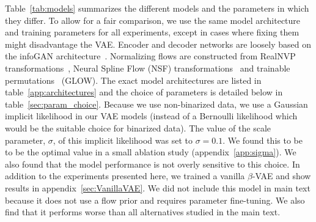 \documentclass[10pt]{article} \usepackage[accepted]{tmlr}
\newcommand{\rev}[1]{{\color{black}#1}}
\begin{document}
Table~\ref{tab:models} summarizes the different models and the parameters in which they differ. To allow for a fair comparison, we use the same model architecture and training parameters for all experiments, except in cases where fixing them might disadvantage the VAE. Encoder and decoder networks are loosely based on the infoGAN architecture~\citep{infoGAN}. Normalizing flows are constructed from RealNVP transformations~\citep{DinhSB16}, Neural Spline Flow (NSF) transformations~\citep{durkan2019neural} and trainable permutations~\citep{glow} (GLOW). The exact model architectures are listed in table~\ref{app:architectures} and the choice of parameters is detailed below in table~\ref{sec:param_choice}. Because we use non-binarized data, we use a Gaussian implicit likelihood in our VAE models (instead of a Bernoulli likelihood which would be the suitable choice for binarized data). The value of the scale parameter, $\sigma$, of this implicit likelihood was set to $\sigma=0.1$. We found this to be to be the optimal value in a small ablation study (appendix~\ref{app:sigma}). We also found that the model performance is not overly sensitive to this choice. \rev{In addition to the experiments presented here, we trained a vanilla $\beta$-VAE and show results in appendix~\ref{sec:VanillaVAE}. We did not include this model in main text because it does not use a flow prior and requires parameter fine-tuning. We also find that it performs worse than all alternatives studied in the main text.}
\end{document}
